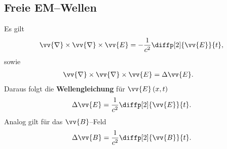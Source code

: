 \documentclass[a4paper,12pt]{article}
\begin{document}
\subsection{Freie EM--Wellen}
Es gilt
\begin{align*} 
        \vv{\nabla }\times \vv{\nabla }\times \vv{E}=-\dfrac{1}{c^2}\diffp[2]{\vv{E}}{t}
,\end{align*} 
sowie
\begin{align*} 
        \vv{\nabla }\times \vv{\nabla }\times \vv{E}&=\Delta \vv{E}
.\end{align*} 
Daraus folgt die \textbf{Wellengleichung} für $\vv{E}\left(x,t\right)$ 
\begin{align*} 
        \Delta \vv{E}=\dfrac{1}{c^2}\diffp[2]{\vv{E}}{t}
.\end{align*} 
Analog gilt für das $\vv{B}$--Feld
\begin{align*} 
        \Delta \vv{B}=\dfrac{1}{c^2}\diffp[2]{\vv{B}}{t}
.\end{align*} 























\end{document}
